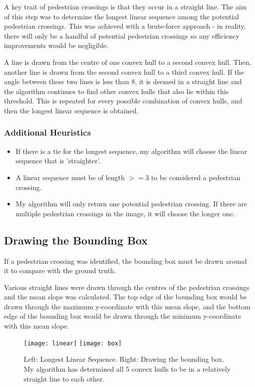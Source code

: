 \documentclass{article}  %
\begin{document}
	A key trait of pedestrian crossings is that they occur in a straight line. The aim of this step was to determine the longest linear sequence among the potential pedestrian crossings. This was achieved with a brute-force approach - in reality, there will only be a handful of potential pedestrian crossings so any efficiency improvements would be negligible.
	
	A line is drawn from the centre of one convex hull to a second convex hull. Then, another line is drawn from the second convex hull to a third convex hull. If the angle between these two lines is less than $8$\textdegree, it is deemed in a straight line and the algorithm continues to find other convex hulls that also lie within this threshold. This is repeated for every possible combination of convex hulls, and then the longest linear sequence is obtained.
	
	\subsubsection*{Additional Heuristics}
	
	\begin{itemize}
		\item If there is a tie for the longest sequence, my algorithm will choose the linear sequence that is 'straighter'.
		\item A linear sequence must be of length $>= 3$ to be considered a pedestrian crossing.
		\item My algorithm will only return one potential pedestrian crossing. If there are multiple pedestrian crossings in the image, it will choose the longer one.
	\end{itemize}
	
	\subsection{Drawing the Bounding Box}\label{bounding-box}
	
	If a pedestrian crossing was identified, the bounding box must be drawn around it to compare with the ground truth.
	
	Various straight lines were drawn through the centres of the pedestrian crossings and the mean slope was calculated. The top edge of the bounding box would be drawn through the maximum y-coordinate with this mean slope, and the bottom edge of the bounding box would be drawn through the minimum y-coordinate with this mean slope.
	
	\begin{figure}[H]
		\centering
		\texttt{[image: linear]}
		\texttt{[image: box]}
		\caption{Left: Longest Linear Sequence. Right: Drawing the bounding box. My algorithm has determined all $5$ convex hulls to be in a relatively straight line to each other.}
	\end{figure}
	
\end{document}

